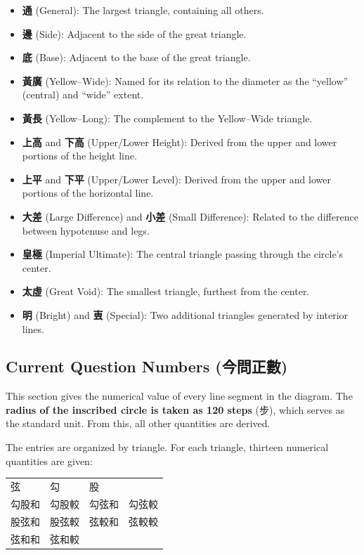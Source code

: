 \documentclass[11pt,a4paper]{article}
\begin{document}
\begin{itemize}[leftmargin=2em]
  \item \textbf{通} (General): The largest triangle, containing all others.
  \item \textbf{邊} (Side): Adjacent to the side of the great triangle.
  \item \textbf{底} (Base): Adjacent to the base of the great triangle.
  \item \textbf{黃廣} (Yellow--Wide): Named for its relation to the diameter as the ``yellow'' (central) and ``wide'' extent.
  \item \textbf{黃長} (Yellow--Long): The complement to the Yellow--Wide triangle.
  \item \textbf{上高} and \textbf{下高} (Upper/Lower Height): Derived from the upper and lower portions of the height line.
  \item \textbf{上平} and \textbf{下平} (Upper/Lower Level): Derived from the upper and lower portions of the horizontal line.
  \item \textbf{大差} (Large Difference) and \textbf{小差} (Small Difference): Related to the difference between hypotenuse and legs.
  \item \textbf{皇極} (Imperial Ultimate): The central triangle passing through the circle's center.
  \item \textbf{太虛} (Great Void): The smallest triangle, furthest from the center.
  \item \textbf{明} (Bright) and \textbf{叀} (Special): Two additional triangles generated by interior lines.
\end{itemize}

\subsection{Current Question Numbers (今問正數)}
\label{subsec:numbers}

This section gives the numerical value of every line segment in the diagram. The \textbf{radius of the inscribed circle is taken as 120 steps} (步), which serves as the standard unit. From this, all other quantities are derived.

The entries are organized by triangle. For each triangle, thirteen numerical quantities are given:

\begin{center}
\begin{tabular}{llll}
弦 & 勾 & 股 & \\
勾股和 & 勾股較 & 勾弦和 & 勾弦較 \\
股弦和 & 股弦較 & 弦較和 & 弦較較 \\
弦和和 & 弦和較 & & \\
\end{tabular}
\end{center}
\end{document}
